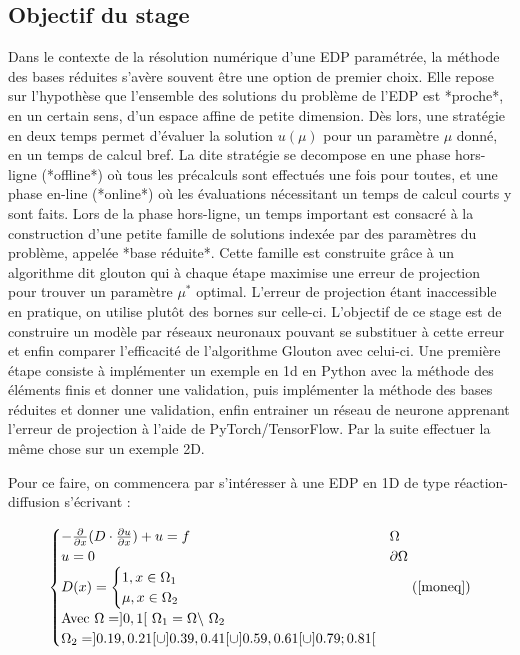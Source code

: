 \documentclass[12pt]{article}
\begin{document}
\subsection{Objectif du stage}


Dans le contexte de la résolution numérique d'une EDP paramétrée, la méthode des bases réduites \cite{Gianluigi Rozza} s'avère souvent être une option de premier choix.
Elle repose sur l'hypothèse que l'ensemble des solutions du problème de l'EDP est *proche*, en un certain sens, d'un espace affine de petite dimension.
Dès lors, une stratégie en deux temps permet d'évaluer la solution $u(\mu)$ pour un paramètre $\mu$ donné, en un temps de calcul bref.
La dite stratégie se decompose en une phase hors-ligne (*offline*) où tous les précalculs sont effectués une fois pour toutes, et une phase en-line (*online*) où les évaluations nécessitant un temps de calcul courts y sont faits.
Lors de la phase hors-ligne, un temps important est consacré à la construction d'une petite famille de solutions indexée par des paramètres du problème, appelée *base réduite*.
Cette famille est construite grâce à un algorithme dit glouton qui à chaque étape maximise une erreur de projection pour trouver un paramètre $\mu^*$ optimal.
L'erreur de projection étant inaccessible en pratique, on utilise plutôt des bornes sur celle-ci.
L'objectif de ce stage est de construire un modèle par réseaux neuronaux pouvant se substituer à cette erreur et enfin comparer l'efficacité de l'algorithme Glouton avec celui-ci. Une première étape consiste à implémenter un exemple en 1d en Python avec la méthode des éléments finis et donner une validation, puis implémenter la méthode des bases réduites et donner une validation, enfin entrainer un réseau de neurone apprenant l'erreur de projection à l'aide de PyTorch/TensorFlow. Par la suite effectuer la même chose sur un exemple 2D.






Pour ce faire, on commencera par s'intéresser à une EDP en 1D de type réaction-diffusion s'écrivant : 

$$
\begin{cases} 
- \frac{\partial }{\partial x}(D \cdot \frac{\partial u}{\partial x}) + u = f  & \Omega   \\
u = 0  & \partial \Omega \\
D(x) = 
\begin{cases} 
1 , x \in \Omega _{1} \\
\mu , x \in \Omega _{2}
\end{cases} \\
\text{Avec } \Omega =  ]0,1[ \text{   } \Omega _{1} = \Omega \backslash\ \Omega_{2}  \\
\Omega _{2} = ]0.19, 0.21[ \cup  ]0.39, 0.41[ \cup ]0.59, 0.61[ 
\cup ]0.79; 0.81[ 
\label{moneq}
\end{cases}%
(\ref{moneq})
$$
\end{document}
